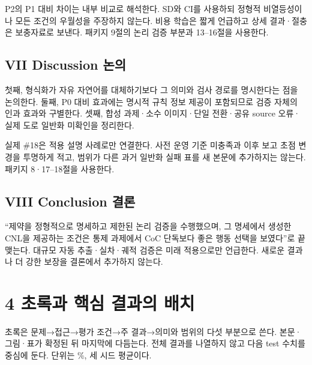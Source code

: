 \documentclass[11pt,a4paper]{article}
\begin{document}
P2의 P1 대비 차이는 내부 비교로 해석한다. SD와 CI를 사용하되 정형적 비열등성이나 모든 조건의 우월성을 주장하지 않는다. 비용 학습은 짧게 언급하고 상세 결과·절충은 보충자료로 보낸다. 패키지 9절의 논리 검증 부분과 13–16절을 사용한다.\par

\subsection*{VII Discussion 논의}

첫째, 형식화가 자유 자연어를 대체하기보다 그 의미와 검사 경로를 명시한다는 점을 논의한다. 둘째, P0 대비 효과에는 명시적 규칙 정보 제공이 포함되므로 검증 자체의 인과 효과와 구별한다. 셋째, 합성 과제·소수 이미지·단일 전환·공유 source 오류·실제 도로 일반화 미확인을 정리한다.\par

실제 \#18은 적용 설명 사례로만 연결한다. 사전 운영 기준 미충족과 이후 보고 초점 변경을 투명하게 적고, 범위가 다른 과거 일반화 실패 표를 새 본문에 추가하지는 않는다. 패키지 8·17–18절을 사용한다.\par

\subsection*{VIII Conclusion 결론}

“제약을 정형적으로 명세하고 제한된 논리 검증을 수행했으며, 그 명세에서 생성한 CNL을 제공하는 조건은 통제 과제에서 CoC 단독보다 좋은 행동 선택을 보였다”로 끝맺는다. 대규모 자동 추출·실차·궤적 검증은 미래 적용으로만 언급한다. 새로운 결과나 더 강한 보장을 결론에서 추가하지 않는다.\par

\section*{4 초록과 핵심 결과의 배치}

초록은 문제→접근→평가 조건→주 결과→의미와 범위의 다섯 부분으로 쓴다. 본문·그림·표가 확정된 뒤 마지막에 다듬는다. 전체 결과를 나열하지 않고 다음 test 수치를 중심에 둔다. 단위는 \%, 세 시드 평균이다.\par
\end{document}
